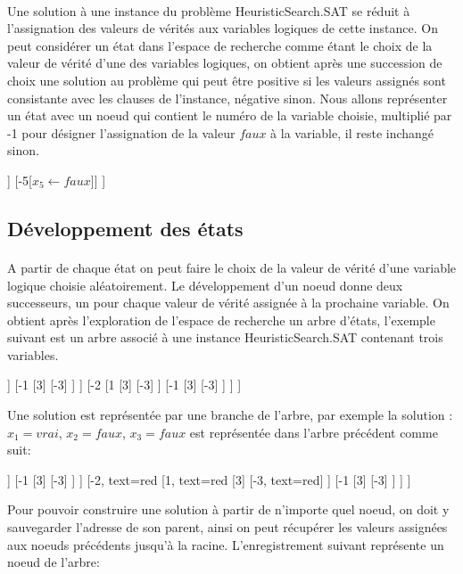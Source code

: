\paragraph{}
Une solution à une instance du problème HeuristicSearch.SAT se réduit à l’assignation des valeurs de vérités aux variables logiques de cette instance. On peut considérer un état dans l’espace de recherche comme étant le choix de la valeur de vérité d’une des variables logiques, on obtient après une succession de choix une solution au problème qui peut être positive si les valeurs assignés sont consistante avec les clauses de l’instance, négative sinon. Nous allons représenter un état avec un noeud qui contient le numéro de la variable choisie, multiplié par -1 pour désigner l’assignation de la valeur $faux$ à la variable, il reste inchangé sinon.\\
\begin{center}
	\begin{forest} [
		[5[$x_{5} \leftarrow vrai$]]
		[-5[$x_{5} \leftarrow faux$]]
		]
	\end{forest}
\end{center}
\newpage
\subsection{Développement des états}
\paragraph{}
A partir de chaque état on peut faire le choix de la valeur de vérité d’une variable logique choisie aléatoirement. Le développement d’un noeud donne deux successeurs, un pour chaque valeur de vérité assignée à la prochaine variable. On obtient après l’exploration de l’espace de recherche un arbre d’états, l’exemple suivant est un arbre associé à une instance HeuristicSearch.SAT contenant trois variables.\\
\begin{center}
	\begin{forest} [
		[2
			[1
				[3]
				[-3]
			]
			[-1
				[3]
				[-3]
			]
		]
		[-2
			[1
				[3]
				[-3]
			]
			[-1
				[3]
				[-3]
			]
		]
		]
	\end{forest}
\end{center}
Une solution est représentée par une branche de l’arbre, par exemple la solution : $x_{1} = vrai$, $x_{2} = faux$, $x_{3} = faux$ est représentée dans l’arbre précédent comme suit:
\begin{center}
	\begin{forest} [
		[2
		[1
		[3]
		[-3]
		]
		[-1
		[3]
		[-3]
		]
		]
		[-2, text=red
		[1, text=red
		[3]
		[-3, text=red]
		]
		[-1
		[3]
		[-3]
		]
		]
		]
	\end{forest}
\end{center}
Pour pouvoir construire une solution à partir de n’importe quel noeud, on doit y sauvegarder l’adresse de son parent, ainsi on peut récupérer les valeurs assignées aux noeuds précédents jusqu’à la racine. L’enregistrement suivant représente un noeud de l’arbre:


